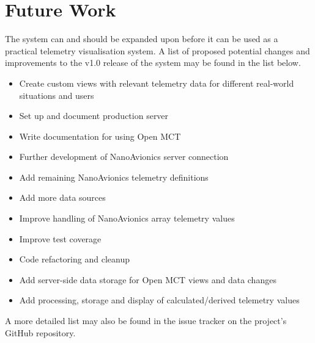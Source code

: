 \begin{comment}
Adding more inputs to the system, such as UAVs/autonaut/etc.

Adding custom visualizations

Add image/data output from imager
\end{comment}

\section{Future Work}

The system can and should be expanded upon before it can be used as a practical telemetry visualisation system. A list of proposed potential changes and improvements to the v1.0 release of the system may be found in the list below.

\begin{itemize}
  \item Create custom views with relevant telemetry data for different real-world situations and users
  \item Set up and document production server
  \item Write documentation for using Open MCT
  \item Further development of NanoAvionics server connection
  \item Add remaining NanoAvionics telemetry definitions
  \item Add more data sources
  \item Improve handling of NanoAvionics array telemetry values
  \item Improve test coverage
  \item Code refactoring and cleanup
  \item Add server-side data storage for Open MCT views and data changes
  \item Add processing, storage and display of calculated/derived telemetry values
\end{itemize}

A more detailed list may also be found in the issue tracker on the project's GitHub repository.